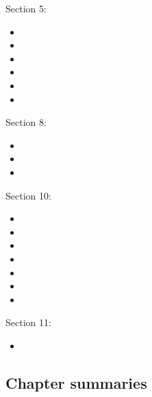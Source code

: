 \begin{ASM_chapter}
Section 5: 
\begin{itemize}
	\item	{}
	\item	{}
	\item	{}
	\item	{}
	\item	{}
	\item	{}
\end{itemize}
Section 8: 
\begin{itemize}
	\item	{}
	\item	{}
	\item	{}
\end{itemize}
Section 10: 
\begin{itemize}
	\item	{}
	\item	{}
	\item	{}
	\item	{}
	\item	{}
	\item	{}
	\item	{}
\end{itemize}
Section 11: 
\begin{itemize}
	\item	{}
\end{itemize}
\end{ASM_chapter}

\subsection{Chapter summaries}

